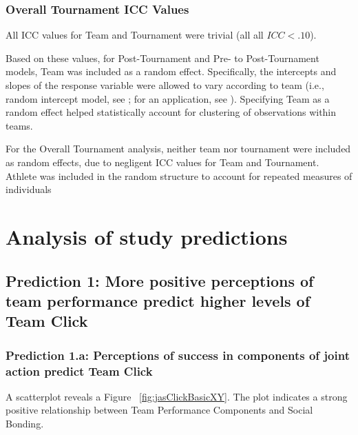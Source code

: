 \begin{CJK}{UTF8}{gbsn}
\subsubsection{Overall Tournament ICC Values}

All ICC values for Team and Tournament were trivial (all all $ICC < .10$).





Based on these values, for Post-Tournament and Pre- to Post-Tournament models,  Team was included as a random effect. Specifically, the intercepts and slopes of the response variable were allowed to vary according to team (i.e., random intercept model, see \citep{Pinheiro2000}; for an application, see \citep{Oberauer2006}). Specifying Team as a random effect helped statistically account for clustering of observations within teams.

For the Overall Tournament analysis, neither team nor tournament were included as random effects, due to negligent ICC values for Team and Tournament.  Athlete was included in the random structure to account for repeated measures of individuals















\clearpage




\section{Analysis of study predictions}


\subsection{Prediction 1: More positive perceptions of team performance predict higher levels of Team Click}

\subsubsection{Prediction 1.a: Perceptions of success in components of joint action predict Team Click}




A scatterplot reveals a Figure ~\ref{fig:jasClickBasicXY}. The plot indicates a strong positive relationship between Team Performance Components and Social Bonding.


\end{CJK}
